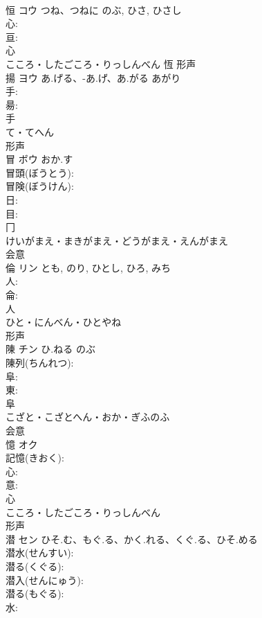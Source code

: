 \documentclass[8pt]{extreport}
\begin{document}
\begin{CJK}{UTF8}{min}
\\	恒	コウ	つね、つねに	のぶ, ひさ, ひさし	
\\	心: 
\\	亘: 
\\	心	
\\	こころ・したごころ・りっしんべん	恆	形声 
\\	揚	ヨウ	あ.げる、-あ.げ、あ.がる	あがり	
\\	手: 
\\	昜: 
\\	手	
\\	て・てへん	
\\	形声 
\\	冒	ボウ	おか.す		
\\	冒頭(ぼうとう): 
\\	冒険(ぼうけん): 
\\	日: 
\\	目: 
\\	冂	
\\	けいがまえ・まきがまえ・どうがまえ・えんがまえ	
\\	会意 
\\	倫	リン		とも, のり, ひとし, ひろ, みち	
\\	人: 
\\	侖: 
\\	人	
\\	ひと・にんべん・ひとやね	
\\	形声 
\\	陳	チン	ひ.ねる	のぶ	
\\	陳列(ちんれつ): 
\\	阜: 
\\	東: 
\\	阜	
\\	こざと・こざとへん・おか・ぎふのふ	
\\	会意 
\\	憶	オク			
\\	記憶(きおく): 
\\	心: 
\\	意: 
\\	心	
\\	こころ・したごころ・りっしんべん	
\\	形声 
\\	潜	セン	ひそ.む、もぐ.る、かく.れる、くぐ.る、ひそ.める		
\\	潜水(せんすい): 
\\	潜る(くぐる): 
\\	潜入(せんにゅう): 
\\	潜る(もぐる): 
\\	水: 

\end{CJK}
\end{document}
